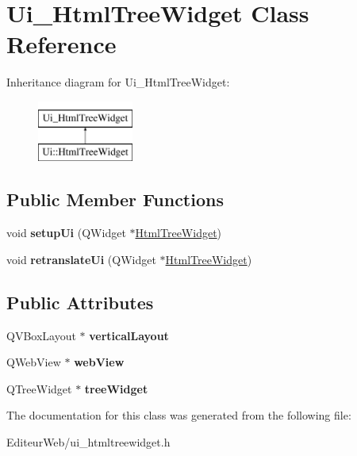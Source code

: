 \hypertarget{class_ui___html_tree_widget}{
\section{Ui\_\-HtmlTreeWidget Class Reference}
\label{class_ui___html_tree_widget}
}
Inheritance diagram for Ui\_\-HtmlTreeWidget:\begin{figure}[H]
\begin{center}
\leavevmode
\includegraphics[height=2.000000cm]{class_ui___html_tree_widget}
\end{center}
\end{figure}
\subsection*{Public Member Functions}
\begin{DoxyCompactItemize}
\item 
\hypertarget{class_ui___html_tree_widget_a1770f9f0d1d823b0045b4df8182d6769}{
void {\bfseries setupUi} (QWidget $\ast$\hyperlink{class_html_tree_widget}{HtmlTreeWidget})}
\label{class_ui___html_tree_widget_a1770f9f0d1d823b0045b4df8182d6769}

\item 
\hypertarget{class_ui___html_tree_widget_ad96a8c3bb76f9afde41c67f504aa4d40}{
void {\bfseries retranslateUi} (QWidget $\ast$\hyperlink{class_html_tree_widget}{HtmlTreeWidget})}
\label{class_ui___html_tree_widget_ad96a8c3bb76f9afde41c67f504aa4d40}

\end{DoxyCompactItemize}
\subsection*{Public Attributes}
\begin{DoxyCompactItemize}
\item 
\hypertarget{class_ui___html_tree_widget_a1fd30c0ba90c7bedf3d72816027fefb6}{
QVBoxLayout $\ast$ {\bfseries verticalLayout}}
\label{class_ui___html_tree_widget_a1fd30c0ba90c7bedf3d72816027fefb6}

\item 
\hypertarget{class_ui___html_tree_widget_a1ee4c443f0b2f76710562ad12e39855e}{
QWebView $\ast$ {\bfseries webView}}
\label{class_ui___html_tree_widget_a1ee4c443f0b2f76710562ad12e39855e}

\item 
\hypertarget{class_ui___html_tree_widget_a36b3595a0fcb3056f5c6e37086e03397}{
QTreeWidget $\ast$ {\bfseries treeWidget}}
\label{class_ui___html_tree_widget_a36b3595a0fcb3056f5c6e37086e03397}

\end{DoxyCompactItemize}


The documentation for this class was generated from the following file:\begin{DoxyCompactItemize}
\item 
EditeurWeb/ui\_\-htmltreewidget.h\end{DoxyCompactItemize}
